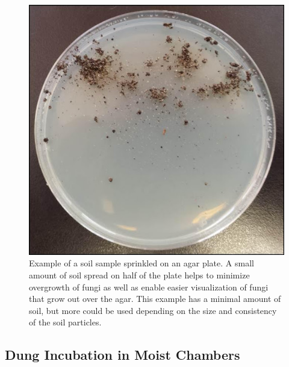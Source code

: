\documentclass[]{book}
\begin{document}
\begin{figure}

{\centering \includegraphics{img/Ch2_Fig2} 

}

\caption{ Example of a soil sample sprinkled on an agar plate.  A small amount of soil spread on half of the plate helps to minimize overgrowth of fungi as well as enable easier visualization of fungi that grow out over the agar.  This example has a minimal amount of soil, but more could be used depending on the size and consistency of the soil particles.}\label{fig:ch2fig2}
\end{figure}

\hypertarget{dung-incubation-in-moist-chambers}{%
\subsection{Dung Incubation in Moist Chambers}\label{dung-incubation-in-moist-chambers}}
\end{document}
